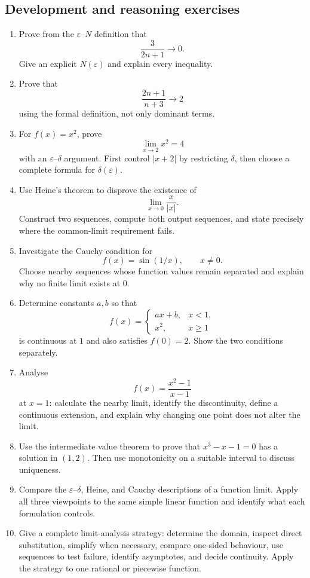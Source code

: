 \subsection{Development and reasoning exercises}

\begin{enumerate}
\item Prove from the $\varepsilon$--$N$ definition that
\[
\frac{3}{2n+1}\longrightarrow0.
\]
Give an explicit $N(\varepsilon)$ and explain every inequality.

\item Prove that
\[
\frac{2n+1}{n+3}\longrightarrow2
\]
using the formal definition, not only dominant terms.

\item For $f(x)=x^2$, prove
\[
\lim_{x\to2}x^2=4
\]
with an $\varepsilon$--$\delta$ argument. First control $|x+2|$ by restricting $\delta$, then choose a complete formula for $\delta(\varepsilon)$.

\item Use Heine's theorem to disprove the existence of
\[
\lim_{x\to0}\frac{x}{|x|}.
\]
Construct two sequences, compute both output sequences, and state precisely where the common-limit requirement fails.

\item Investigate the Cauchy condition for
\[
f(x)=\sin(1/x),\qquad x\ne0.
\]
Choose nearby sequences whose function values remain separated and explain why no finite limit exists at $0$.

\item Determine constants $a,b$ so that
\[
f(x)=\begin{cases}
ax+b,&x<1,\\
x^2,&x\ge1
\end{cases}
\]
is continuous at $1$ and also satisfies $f(0)=2$. Show the two conditions separately.

\item Analyse
\[
f(x)=\frac{x^2-1}{x-1}
\]
at $x=1$: calculate the nearby limit, identify the discontinuity, define a continuous extension, and explain why changing one point does not alter the limit.

\item Use the intermediate value theorem to prove that $x^3-x-1=0$ has a solution in $(1,2)$. Then use monotonicity on a suitable interval to discuss uniqueness.

\item Compare the $\varepsilon$--$\delta$, Heine, and Cauchy descriptions of a function limit. Apply all three viewpoints to the same simple linear function and identify what each formulation controls.

\item Give a complete limit-analysis strategy: determine the domain, inspect direct substitution, simplify when necessary, compare one-sided behaviour, use sequences to test failure, identify asymptotes, and decide continuity. Apply the strategy to one rational or piecewise function.
\end{enumerate}
